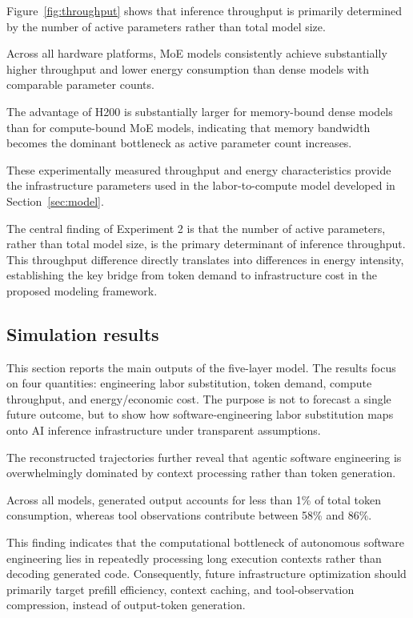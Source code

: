 \documentclass{article}
\begin{document}
Figure~\ref{fig:throughput}
shows that inference throughput is primarily determined by the number of active parameters rather than total model size.

Across all hardware platforms, MoE models consistently achieve substantially higher throughput and lower energy consumption than dense models with comparable parameter counts.

The advantage of H200 is substantially larger for memory-bound dense models than for compute-bound MoE models, indicating that memory bandwidth becomes the dominant bottleneck as active parameter count increases.

These experimentally measured throughput and energy characteristics provide the infrastructure parameters used in the labor-to-compute model developed in Section~\ref{sec:model}.

The central finding of Experiment 2 is that the number of active parameters, rather than total model size, is the primary determinant of inference throughput. This throughput difference directly translates into differences in energy intensity, establishing the key bridge from token demand to infrastructure cost in the proposed modeling framework.

\subsection{Simulation results}
This section reports the main outputs of the five-layer model. The results focus
on four quantities: engineering labor substitution, token demand, compute
throughput, and energy/economic cost. The purpose is not to forecast a single
future outcome, but to show how software-engineering labor substitution maps
onto AI inference infrastructure under transparent assumptions.

The reconstructed trajectories further reveal that
agentic software engineering is overwhelmingly dominated by
context processing rather than token generation.

Across all models,
generated output accounts for less than 1\%
of total token consumption,
whereas tool observations contribute between
58\% and 86\%.

This finding indicates that the computational bottleneck
of autonomous software engineering lies in repeatedly
processing long execution contexts
rather than decoding generated code.
Consequently,
future infrastructure optimization should primarily target
prefill efficiency,
context caching,
and tool-observation compression,
instead of output-token generation.
\end{document}
